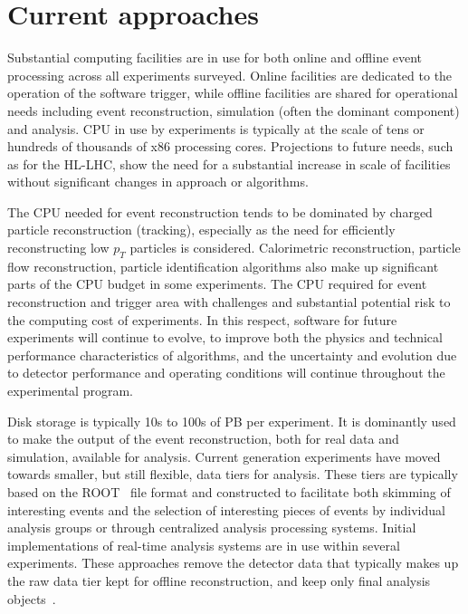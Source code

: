 \section{Current approaches}
  
Substantial computing facilities are in use for both online and offline event processing across all experiments surveyed. Online facilities are dedicated to the operation of the software trigger, while offline facilities are shared for operational needs including event reconstruction, simulation (often the dominant component) and analysis. CPU in use by experiments is typically at the scale of tens or hundreds of thousands of x86 processing cores. Projections to future needs, such as for the HL-LHC, show the need for a substantial increase in scale of facilities without significant changes in approach or algorithms.

The CPU needed for event reconstruction tends to be dominated by charged particle reconstruction (tracking), especially as the need for efficiently reconstructing low $p_T$ particles is considered. Calorimetric reconstruction, particle flow reconstruction, particle identification algorithms also make up significant parts of the CPU budget in some experiments. The CPU required for event reconstruction and trigger area with challenges and substantial potential risk to the computing cost of experiments. In this respect, software for future experiments will continue to evolve, to improve both the physics and technical performance characteristics of algorithms, and the uncertainty and evolution due to detector performance and operating conditions will continue throughout the experimental program.

Disk storage is typically 10s to 100s of PB per experiment. It is dominantly used to make the output of the event reconstruction, both for real data and simulation, available for analysis. Current generation experiments have moved towards smaller, but still flexible, data tiers for analysis. These tiers are typically based on the ROOT~\cite{Brun1996} file format and constructed to facilitate both skimming of interesting events and the selection of interesting pieces of events by individual analysis groups or through centralized analysis processing systems. Initial implementations of real-time analysis systems are in use within several experiments. These approaches remove the detector data that typically makes up the raw data tier kept for offline reconstruction, and keep only final analysis objects~\cite{Aaij2016,ATLAS2017,CMS2016}.

